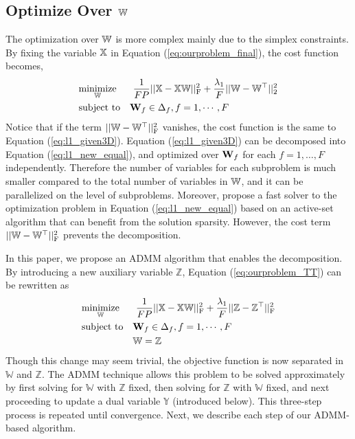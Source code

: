 \subsection{Optimize Over $\mathbb W$} \label{sec:initlization}
The optimization over $\mathbb W$ is more complex mainly due to the simplex constraints.
By fixing the variable $\mathbb X$ in Equation (\ref{eq:ourproblem_final}), the cost function becomes,
\begin{equation}
\begin{aligned}
& \underset{ \mathbb W }{\text{minimize}}&& ~ \frac{1}{FP} || \mathbb X - \mathbb X \mathbb W||_\text{F}^2
 + \frac{\lambda_1}{F} ||\mathbb W - \mathbb W^\top||_2^2 \\
& \text{subject to} && \mathbf W_f \in \Delta_f, f=1,\cdots,F
\end{aligned}
\label{eq:ourproblem_TT}
\end{equation}
Notice that if the term $||\mathbb W - \mathbb W^\top||_\text{F}^2$ vanishes, the cost function is the same to Equation (\ref{eq:l1_given3D}). Equation (\ref{eq:l1_given3D}) can be decomposed into Equation (\ref{eq:l1_new_equal}), and optimized over $\mathbf W_f$ for each $f=1,\dots,F$ independently.
Therefore the number of variables for each subproblem is much smaller compared to the total number of variables in $\mathbb W$, and it can be parallelized on the level of subproblems.
Moreover, \citet{chen:hal-00995911} propose a fast solver to the optimization problem in Equation (\ref{eq:l1_new_equal}) based on an active-set algorithm that can benefit from the solution sparsity.
However, the cost term $||\mathbb W - \mathbb W^\top||_\text{F}^2$ prevents the decomposition.

In this paper, we propose an ADMM algorithm that enables the decomposition.
By introducing a new auxiliary variable $\mathbb{Z}$, Equation (\ref{eq:ourproblem_TT}) can be rewritten as
\begin{equation}
\begin{aligned}
& \underset{ \mathbb W }{\text{minimize}}&& ~ \frac{1}{FP} || \mathbb X - \mathbb X \mathbb W||_\text{F}^2
 + \frac{\lambda_1}{F} ||\mathbb{Z} - \mathbb{Z}^\top||_\text{F}^2 \\
& \text{subject to} && \mathbf W_f \in \Delta_f, f=1,\cdots,F \\
&                   && \mathbb W = \mathbb{Z}
\end{aligned}
\end{equation}
Though this change may seem trivial, the objective function is now separated in $\mathbb{W}$ and $\mathbb{Z}$. 
The ADMM technique allows this problem to be solved approximately by first solving for $\mathbb{W}$ with $\mathbb{Z}$ fixed, then solving for $\mathbb{Z}$ with $\mathbb{W}$ fixed, and next proceeding to update a dual variable $\mathbb{Y}$ (introduced below). This three-step process is repeated until convergence. Next, we describe each step of our ADMM-based algorithm. 

